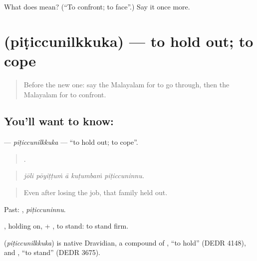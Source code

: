\begin{tcolorbox}[breakable,colback=teal!4,colframe=teal!35!black,title={Before you move on}]
What does  mean? (\textquotedblleft{}To confront; to face\textquotedblright{}.) Say it once more.
\end{tcolorbox}
\section[\texorpdfstring{\ml{പിടിച്ചുനിൽക്കുക} (piṭiccunilkkuka)}{പിടിച്ചുനിൽക്കുക (piṭiccunilkkuka)}]{ (piṭiccunilkkuka) — to hold out; to cope}

\label{lesson:ML-C567-piticcunilkkuka}



\begin{quote}
Before the new one: say the Malayalam for to go through, then the Malayalam for to confront.
\end{quote}

\subsection*{You'll want to know: }
\textbf{} — \emph{piṭiccunilkkuka} — \textquotedblleft{}to hold out; to cope\textquotedblright{}.

\begin{quote}
    .
\end{quote}

\begin{quote}
\emph{jōli pōyiṭṭuṁ ā kuṭumbaṁ piṭiccuninnu.}
\end{quote}

\begin{quote}
Even after losing the job, that family held out.
\end{quote}

Past: , \emph{piṭiccuninnu}.

, holding on, + , to stand: to stand firm.

\begin{cousinweb}
\textbf{} (\emph{piṭiccunilkkuka}) is native Dravidian, a compound of , \textquotedblleft{}to hold\textquotedblright{} (DEDR 4148), and , \textquotedblleft{}to stand\textquotedblright{} (DEDR 3675).
\end{cousinweb}

